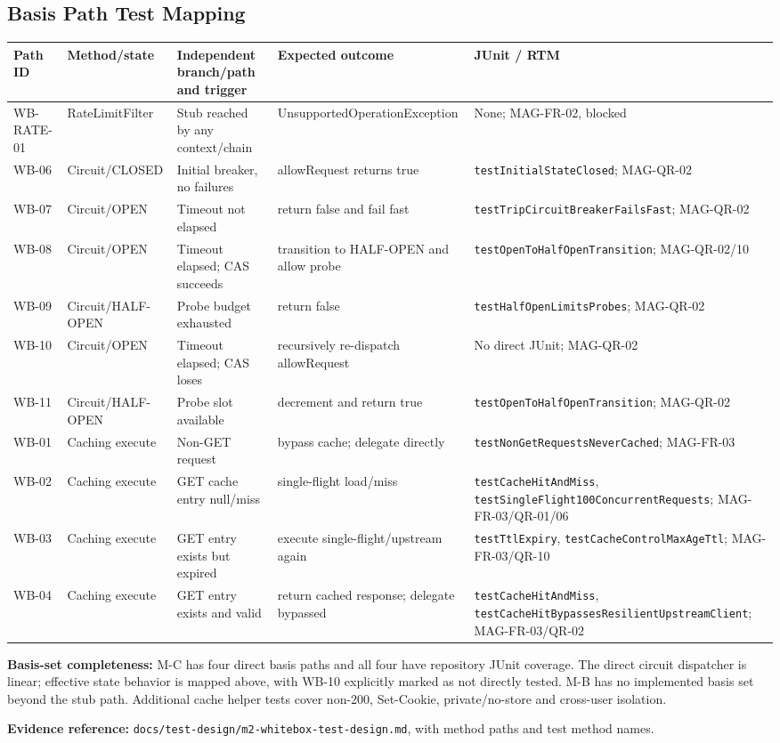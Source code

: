 \documentclass[11pt,a4paper]{article}
\newcommand{\evidence}[1]{\texttt{#1}}
\begin{document}
\subsection{Basis Path Test Mapping}
\begin{longtable}{L{1.4cm} L{2.4cm} L{4.6cm} L{2.8cm} L{2cm}}\toprule
\textbf{Path ID} & \textbf{Method/state} & \textbf{Independent branch/path and trigger} & \textbf{Expected outcome} & \textbf{JUnit / RTM}\\\midrule\endhead
WB-RATE-01 & RateLimitFilter & Stub reached by any context/chain & UnsupportedOperationException & None; MAG-FR-02, blocked\\
WB-06 & Circuit/CLOSED & Initial breaker, no failures & allowRequest returns true & \texttt{testInitialStateClosed}; MAG-QR-02\\
WB-07 & Circuit/OPEN & Timeout not elapsed & return false and fail fast & \texttt{testTripCircuitBreakerFailsFast}; MAG-QR-02\\
WB-08 & Circuit/OPEN & Timeout elapsed; CAS succeeds & transition to HALF-OPEN and allow probe & \texttt{testOpenToHalfOpenTransition}; MAG-QR-02/10\\
WB-09 & Circuit/HALF-OPEN & Probe budget exhausted & return false & \texttt{testHalfOpenLimitsProbes}; MAG-QR-02\\
WB-10 & Circuit/OPEN & Timeout elapsed; CAS loses & recursively re-dispatch allowRequest & No direct JUnit; MAG-QR-02\\
WB-11 & Circuit/HALF-OPEN & Probe slot available & decrement and return true & \texttt{testOpenToHalfOpenTransition}; MAG-QR-02\\
WB-01 & Caching execute & Non-GET request & bypass cache; delegate directly & \texttt{testNonGetRequestsNeverCached}; MAG-FR-03\\
WB-02 & Caching execute & GET cache entry null/miss & single-flight load/miss & \texttt{testCacheHitAndMiss}, \texttt{testSingleFlight100ConcurrentRequests}; MAG-FR-03/QR-01/06\\
WB-03 & Caching execute & GET entry exists but expired & execute single-flight/upstream again & \texttt{testTtlExpiry}, \texttt{testCacheControlMaxAgeTtl}; MAG-FR-03/QR-10\\
WB-04 & Caching execute & GET entry exists and valid & return cached response; delegate bypassed & \texttt{testCacheHitAndMiss}, \texttt{testCacheHitBypassesResilientUpstreamClient}; MAG-FR-03/QR-02\\
\bottomrule\end{longtable}
\textbf{Basis-set completeness:} M-C has four direct basis paths and all four have repository JUnit coverage. The direct circuit dispatcher is linear; effective state behavior is mapped above, with WB-10 explicitly marked as not directly tested. M-B has no implemented basis set beyond the stub path. Additional cache helper tests cover non-200, Set-Cookie, private/no-store and cross-user isolation.\par
\textbf{Evidence reference:} \evidence{docs/test-design/m2-whitebox-test-design.md}, with method paths and test method names.
\end{document}
